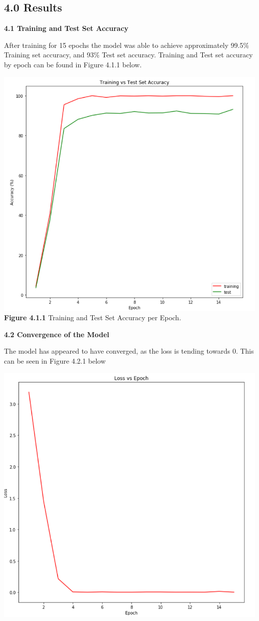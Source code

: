 \documentclass[11pt]{article}
\begin{document}
\begin{multicols}{2}
\subsection*{4.0 Results}
\textbf{4.1 Training and Test Set Accuracy}
\par
After training for 15 epochs the model was able to achieve approximately 99.5\% Training set accuracy, and 93\% Test set accuracy.  Training and Test set accuracy by epoch can be found in Figure 4.1.1 below.
\begin{center}
\includegraphics[scale=.5]{TrainingTest}
\textbf{Figure 4.1.1} Training and Test Set Accuracy per Epoch.
\end{center}
\textbf{4.2 Convergence of the Model}
\par
The model has appeared to have converged, as the loss is tending towards 0.  This can be seen in Figure 4.2.1 below
\begin{center}
\includegraphics[scale=.5]{LossEpoch}

\end{center}
\end{multicols}
\end{document}
